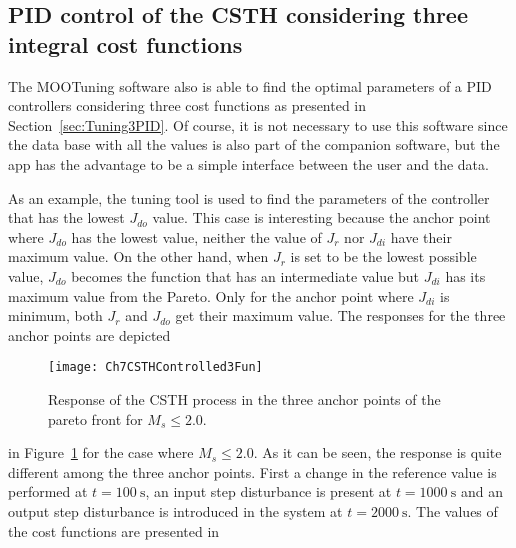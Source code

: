 \subsection{PID control of the CSTH considering three integral cost functions}
\label{sec:PIDCSTH3Fun}
The MOOTuning software also is able to find the optimal parameters of a PID controllers considering three cost functions as presented in Section~\ref{sec:Tuning3PID}. Of course, it is not necessary to use this software since the data base with all the values is also part of the companion software, but the \matlab app has the advantage to be a simple interface between the user and the data.

As an example, the tuning tool is used to find the parameters of the controller that has the lowest $J_{do}$ value. This case is interesting because the anchor point where $J_{do}$ has the lowest value, neither the value of $J_r$ nor $J_{di}$ have their maximum value. On the other hand, when $J_{r}$ is set to be the lowest possible value, $J_{do}$ becomes the function that has an intermediate value but $J_{di}$ has its maximum value from the Pareto. Only for the anchor point where $J_{di}$ is minimum, both $J_r$ and $J_{do}$ get their maximum value. The responses for the three anchor points are depicted %
\begin{figure}[tb]
	\centering
	\texttt{[image: Ch7CSTHControlled3Fun]}
	\caption{Response of the CSTH process in the three anchor points of the pareto front for $M_s \leq 2.0$.}
	\label{fig:Ch7CSTHControlled3Fun}
\end{figure}
%
in Figure~\ref{fig:Ch7CSTHControlled3Fun} for the case where $M_s \leq 2.0$. As it can be seen, the response is quite different among the three anchor points. First a change in the reference value is performed at $t=\SI{100}{\second}$, an input step disturbance is present at $t=\SI{1000}{\second}$ and an output step disturbance is introduced in the system at $t=\SI{2000}{\second}$. The values of the cost functions are presented in %
%
